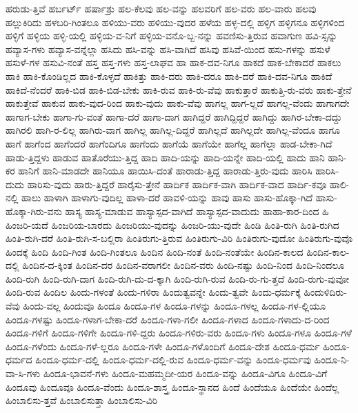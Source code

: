 {ಹರುಡು-ತ್ತಿವೆ
ಹರ್ಬರ್ಟ್
ಹರ್ಷಾಶ್ರು
ಹಲ-ಕೆಲವು
ಹಲ-ವನ್ನು
ಹಲವರಿಗೆ
ಹಲ-ವರು
ಹಲ-ವಾರು
ಹಲವು
ಹಲ್ಲುಕಿರಿದು
ಹಳಬರಿ-ಗಿಂತಲೂ
ಹಳಿಯು-ವರು
ಹಳಿಯು-ವುದರ
ಹಳೆಯ
ಹಳ್ಳ-ದಲ್ಲಿ
ಹಳ್ಳಿಗ
ಹಳ್ಳಿಗನೂ
ಹಳ್ಳಿಗಳಿಂದ
ಹಳ್ಳಿಗೆ
ಹಳ್ಳಿಯ
ಹಳ್ಳಿ-ಯಲ್ಲಿ
ಹಳ್ಳಿಯ-ವ-ನಿಗೆ
ಹಳ್ಳಿಯ-ವನೊ-ಬ್ಬ-ನನ್ನು
ಹವಣಿಸು-ತ್ತಿರುವ
ಹವಾಗುಣ
ಹವಿ-ಸ್ಸನ್ನು
ಹವ್ಯಾಸ-ಗಳು
ಹವ್ಯಾಸ-ವನ್ನೆಲ್ಲಾ
ಹಸಿದು
ಹಸಿ-ವನ್ನು
ಹಸಿ-ವಾಗಿದೆ
ಹಸಿವು
ಹಸಿವೆ-ಯಿಂದ
ಹಸು-ಗಳನ್ನು
ಹಸುಳೆ
ಹಸುಳೆ-ಗಳ
ಹಸುವಿ-ನಂತೆ
ಹಸ್ತ
ಹಸ್ತ-ಗಳು
ಹಸ್ತ-ಲಾಘವ
ಹಾ
ಹಾಕ-ದವ-ನಿಗೂ
ಹಾಕದೆ
ಹಾಕ-ಬೇಕಾದರೆ
ಹಾಕಲು
ಹಾಕಿ
ಹಾಕಿ-ಕೊಂಡಿಲ್ಲದ
ಹಾಕಿ-ಕೊಳ್ಳದೆ
ಹಾಕಿತ್ತು
ಹಾಕಿ-ದರು
ಹಾಕಿ-ದರೂ
ಹಾಕಿ-ದರೆ
ಹಾಕಿ-ದವ-ನಿಗೂ
ಹಾಕಿದೆ
ಹಾಕಿದೆ-ನೆಂದರೆ
ಹಾಕಿ-ಬಿಡ
ಹಾಕಿ-ಬಿಡ-ಬೇಕು
ಹಾಕಿ-ರುವ
ಹಾಕಿ-ರು-ವೆವು
ಹಾಕುತ್ತಾರೆ
ಹಾಕುತ್ತಿ-ರು-ವರು
ಹಾಕು-ತ್ತೇನೆ
ಹಾಕುತ್ತೇವೆ
ಹಾಕುವ
ಹಾಕು-ವುದ-ರಿಂದ
ಹಾಕು-ವುದು
ಹಾಕು-ವೆವು
ಹಾಗಲ್ಲ
ಹಾಗ-ಲ್ಲದೆ
ಹಾಗಲ್ಲ-ವೆಂದು
ಹಾಗಾಗದೇ
ಹಾಗಾಗ-ಬೇಕು
ಹಾಗಾ-ಗು-ವಂತೆ
ಹಾಗಾ-ದರೆ
ಹಾಗಾ-ದಾಗ
ಹಾಗಿದ್ದರೆ
ಹಾಗಿದ್ದಿದ್ದರೆ
ಹಾಗಿದ್ದು
ಹಾಗಿರ-ಬೇಕಾ-ದದ್ದು
ಹಾಗಿರಲಿ
ಹಾಗಿ-ರ-ಲಿಲ್ಲ
ಹಾಗಿರು-ವಾಗ
ಹಾಗಿಲ್ಲ
ಹಾಗಿಲ್ಲ-ದಿದ್ದರೆ
ಹಾಗಿಲ್ಲದೆ
ಹಾಗಿಲ್ಲದೇ
ಹಾಗಿಲ್ಲ-ವೆಂದೂ
ಹಾಗೂ
ಹಾಗೆ
ಹಾಗೆಂದ
ಹಾಗೆಂದರೆ
ಹಾಗೆಂದಿಗೂ
ಹಾಗೆಂದು
ಹಾಗೆಯೆ
ಹಾಗೆಯೇ
ಹಾಗೆಲ್ಲ
ಹಾಗೆಲ್ಲಾ
ಹಾಡ-ಬೇಕಾ-ಗಿದೆ
ಹಾಡು-ತ್ತಿದ್ದಳು
ಹಾಡುವ
ಹಾತೊರೆಯು-ತ್ತಿದ್ದ
ಹಾದಿ
ಹಾದಿ-ಯನ್ನು
ಹಾದಿ-ಯನ್ನೇ
ಹಾದಿ-ಯಲ್ಲಿ
ಹಾದು
ಹಾನಿ
ಹಾನಿ-ಕರ
ಹಾನಿಗೆ
ಹಾನಿ-ಮಾಡದೇ
ಹಾನಿಯೂ
ಹಾಯಿಸಿ-ದಂತೆ
ಹಾರಾಡು-ತ್ತಿದ್ದ
ಹಾರಾಡು-ತ್ತಿರು-ವುದು
ಹಾರಿಸಿ
ಹಾರಿಸಿ-ದುದು
ಹಾರಿಸು-ವುದು
ಹಾರು-ತ್ತಿದ್ದರೆ
ಹಾರೈಸು-ತ್ತೇನೆ
ಹಾರ್ದಿಕ
ಹಾರ್ದಿಕ-ವಾಗಿ
ಹಾರ್ದಿಕ-ವಾದ
ಹಾರ್ದಿ-ಕವೂ
ಹಾಲಿ-ನಲ್ಲಿ
ಹಾಲು
ಹಾಳಾಗಿ
ಹಾಳಾಗು-ವುದಿಲ್ಲ
ಹಾಳಾ-ದರೆ
ಹಾವಳಿ-ಯನ್ನು
ಹಾವು
ಹಾಸು
ಹಾಸು-ಹೊಕ್ಕಾ-ಗಿದೆ
ಹಾಸು-ಹೊಕ್ಕಾ-ಗಿರು-ವನು
ಹಾಸ್ಯ
ಹಾಸ್ಯ-ಮಾಡುವ
ಹಾಸ್ಯಾಸ್ಪದ-ವಾಗಿದೆ
ಹಾಸ್ಯಾಸ್ಪದ-ವಾದುದು
ಹಾಹಾ-ಕಾರ-ದಿಂದ
ಹಿ
ಹಿಂಜರಿ-ಯದೆ
ಹಿಂಜರಿಯ-ಬಾರದು
ಹಿಂಜರಿಯು-ವುದನ್ನು
ಹಿಂಜರಿ-ಯು-ವುದೇ
ಹಿಂಡಿ
ಹಿಂತಿ-ರುಗಿ
ಹಿಂತಿ-ರುಗಿದ
ಹಿಂತಿ-ರುಗಿ-ದರೆ
ಹಿಂತಿ-ರುಗಿ-ಸ-ಬಲ್ಲಿರಾ
ಹಿಂತಿರುಗು-ತ್ತಿರುವ
ಹಿಂತಿರುಗು-ವಿರಿ
ಹಿಂತಿರುಗು-ವುದೋ
ಹಿಂತಿರುಗು-ವುವೊ
ಹಿಂದಕ್ಕೆ
ಹಿಂದಿ
ಹಿಂದಿ-ಗಿಂತ
ಹಿಂದಿ-ಗಿಂತಲೂ
ಹಿಂದಿನ
ಹಿಂದಿ-ನಂತೆ
ಹಿಂದಿ-ನಂತೆಯೇ
ಹಿಂದಿನ-ಕಾಲದ
ಹಿಂದಿನ-ಕಾಲ-ದಲ್ಲಿ
ಹಿಂದಿನ-ದ-ಕ್ಕಿಂತ
ಹಿಂದಿನ-ದರ
ಹಿಂದಿನ-ವರಾಗಲೀ
ಹಿಂದಿನ-ವರು
ಹಿಂದಿ-ನಷ್ಟು
ಹಿಂದಿ-ನಿಂದ
ಹಿಂದಿ-ನಿಂದಲೂ
ಹಿಂದಿ-ರುಗಿ
ಹಿಂದಿ-ರುಗಿ-ದಾಗ
ಹಿಂದಿ-ರುಗಿ-ದು-ದ-ಕ್ಕಾಗಿ
ಹಿಂದಿ-ರುಗಿ-ರುವ
ಹಿಂದಿ-ರು-ಗು-ತ್ತದೆ
ಹಿಂದಿ-ರುಗು-ವುವೋ
ಹಿಂದಿ-ರುವ
ಹಿಂದಿಲ
ಹಿಂದು-ಗಳಂತೆ
ಹಿಂದು-ಗಳಿರಾ
ಹಿಂದುತ್ವವನ್ನೇ
ಹಿಂದು-ತ್ವವೇ
ಹಿಂದು-ಧರ್ಮಕ್ಕೆ
ಹಿಂದುಳಿದಿರು-ವೆವು
ಹಿಂದು-ವಲ್ಲ
ಹಿಂದುವೂ
ಹಿಂದೂ
ಹಿಂದೂ-ಗಳ
ಹಿಂದೂ-ಗಳನ್ನು
ಹಿಂದೂ-ಗಳಲ್ಲ
ಹಿಂದೂ-ಗಳ-ಲ್ಲಿಯೂ
ಹಿಂದೂ-ಗಳಷ್ಟು
ಹಿಂದೂ-ಗಳಾಗ-ಬೇಕಾ-ದರೆ
ಹಿಂದೂ-ಗಳಾ-ಗಲೀ
ಹಿಂದೂ-ಗಳಾದ
ಹಿಂದೂ-ಗಳಾದು-ದ-ರಿಂದ
ಹಿಂದೂ-ಗಳಿಗೆ
ಹಿಂದೂ-ಗಳಿಗೇ
ಹಿಂದೂ-ಗಳಿ-ದ್ದರು
ಹಿಂದೂ-ಗಳಿರು-ವರು
ಹಿಂದೂ-ಗಳು
ಹಿಂದೂ-ಗಳೂ
ಹಿಂದೂ-ಗಳೆ
ಹಿಂದೂ-ಗಳೆಂದು
ಹಿಂದೂ-ಗಳೆ-ಲ್ಲರೂ
ಹಿಂದೂ-ಗಳೇ
ಹಿಂದೂ-ಗಳೊಂದಿಗೆ
ಹಿಂದೂ-ದೇಶ
ಹಿಂದೂ-ಧರ್ಮ
ಹಿಂದೂ-ಧರ್ಮದ
ಹಿಂದೂ-ಧರ್ಮ-ದಲ್ಲಿ
ಹಿಂದೂ-ಧರ್ಮ-ದಲ್ಲಿ-ರುವ
ಹಿಂದೂ-ಧರ್ಮ-ವನ್ನು
ಹಿಂದೂ-ಧರ್ಮವು
ಹಿಂದೂ-ನಿ-ವಾ-ಸಿ-ಗಳು
ಹಿಂದೂ-ಭಾವನೆ-ಗಳು
ಹಿಂದೂ-ಮಹಮ್ಮದೀ-ಯರ
ಹಿಂದೂ-ವನ್ನು
ಹಿಂದೂ-ವಿಗೂ
ಹಿಂದೂ-ವಿಗೆ
ಹಿಂದೂವು
ಹಿಂದೂವೂ
ಹಿಂದೂ-ವೆಂದು
ಹಿಂದೂ-ಶಾಸ್ತ್ರ
ಹಿಂದೂ-ಸ್ಥಾನದ
ಹಿಂದೆ
ಹಿಂದೆಯೂ
ಹಿಂದೆಯೇ
ಹಿಂದೆಲ್ಲ
ಹಿಂಬಾಲಿಸು-ತ್ತವೆ
ಹಿಂಬಾಲಿಸುತ್ತಾ
ಹಿಂಬಾಲಿಸು-ವಿರಿ
}
